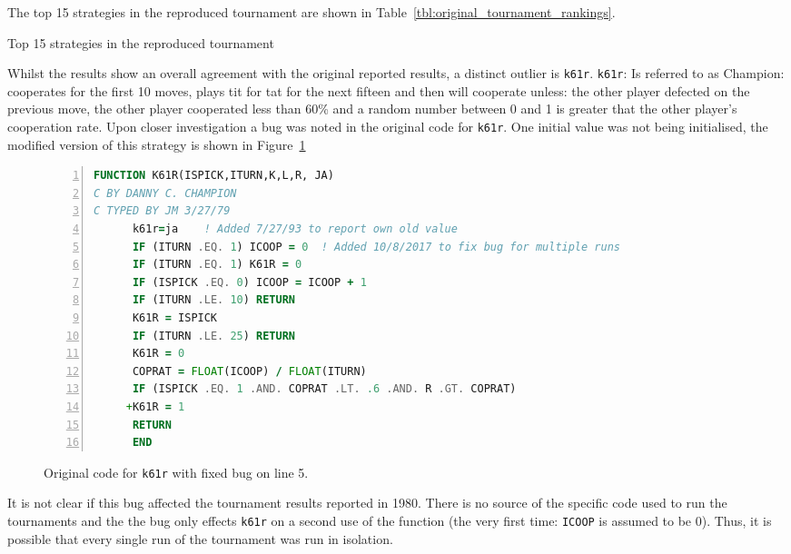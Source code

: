 \documentclass{article}
\begin{document}
The top 15 strategies in the reproduced tournament are shown in
Table~\ref{tbl:original_tournament_rankings}.

\begin{table}[!hbtp]
        \centering
        
        \caption{Top 15 strategies in the reproduced tournament}
        \label{tbl:original_tournament_rankings}
\end{table}

Whilst the results show an overall agreement with the original reported results,
a distinct outlier is \texttt{k61r}.
\texttt{k61r}: Is referred to as Champion: cooperates for the first 10
moves, plays tit for tat for the next fifteen and then will cooperate
unless: the other player defected on the previous move, the
other player cooperated less than 60\% and a random number between
0 and 1 is greater that the other player's cooperation rate. 
Upon closer investigation a bug was noted in the original code for
\texttt{k61r}. One initial value was not being initialised, the modified version
of this strategy is shown in Figure~\ref{fig:k61r}

\begin{figure}[!hbtp]
    \begin{center}
        \begin{lstlisting}[language=Fortran,
                           basicstyle=\ttfamily,
                           frame=single,
                           keywordstyle=\color{red},
                           numbers=left,
                           commentstyle=\color{green}]
      FUNCTION K61R(ISPICK,ITURN,K,L,R, JA)
C BY DANNY C. CHAMPION
C TYPED BY JM 3/27/79
      k61r=ja    ! Added 7/27/93 to report own old value
      IF (ITURN .EQ. 1) ICOOP = 0  ! Added 10/8/2017 to fix bug for multiple runs
      IF (ITURN .EQ. 1) K61R = 0
      IF (ISPICK .EQ. 0) ICOOP = ICOOP + 1
      IF (ITURN .LE. 10) RETURN
      K61R = ISPICK
      IF (ITURN .LE. 25) RETURN
      K61R = 0
      COPRAT = FLOAT(ICOOP) / FLOAT(ITURN)
      IF (ISPICK .EQ. 1 .AND. COPRAT .LT. .6 .AND. R .GT. COPRAT)
     +K61R = 1
      RETURN
      END 
        \end{lstlisting}
        \caption{Original code for \texttt{k61r} with fixed bug on line 5.}
        \label{fig:k61r}
    \end{center}
\end{figure}

It is not clear if this bug affected the tournament results reported in 1980.
There is no source of the specific code used to run the tournaments and the
the bug only effects \texttt{k61r} on a second use of the function (the very
first time: \texttt{ICOOP} is assumed to be 0). Thus, it is possible that every
single run of the tournament was run in isolation.
\end{document}
